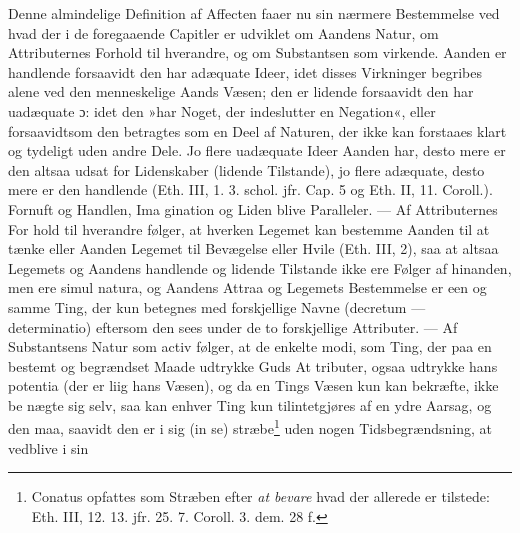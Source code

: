 \documentclass[12pt,a4paper]{book}
\newcommand{\opage}[1]{\marginnote{\footnotesize\textit{[#1]}}}
\begin{document}
Denne almindelige Definition af Affecten faaer nu sin
nærmere Bestemmelse ved hvad der i de foregaaende Capitler
er udviklet om Aandens Natur, om Attributernes Forhold
til hverandre, og om Substantsen som virkende. Aanden
er handlende forsaavidt den har adæquate Ideer, idet
disses Virkninger begribes alene ved den menneskelige
Aands Væsen; den er lidende forsaavidt den har uadæquate
ɔ: idet den »har Noget, der indeslutter en Negation«, eller
forsaavidtsom den betragtes som en Deel af Naturen, der
ikke kan forstaaes klart og tydeligt uden andre Dele. Jo
\opage{112} \setcounter{footnote}{0}%
flere uadæquate Ideer Aanden har, desto mere er den altsaa
udsat for Lidenskaber (lidende Tilstande), jo flere adæquate,
desto mere er den handlende (Eth. III, 1. 3. schol. jfr.
Cap. 5 og Eth. II, 11. Coroll.). Fornuft og Handlen, Ima\-%
gination og Liden blive Paralleler. --- Af Attributernes For\-%
hold til hverandre følger, at hverken Legemet kan bestemme
Aanden til at tænke eller Aanden Legemet til Bevægelse
eller Hvile (Eth. III, 2), saa at altsaa Legemets og Aandens
handlende og lidende Tilstande ikke ere Følger af hinanden,
men ere simul natura, og Aandens Attraa og Legemets
Bestemmelse er een og samme Ting, der kun betegnes med
forskjellige Navne (decretum --- determinatio) eftersom den
sees under de to forskjellige Attributer. --- Af Substantsens
Natur som activ følger, at de enkelte modi, som Ting, der
paa en bestemt og begrændset Maade udtrykke Guds At\-%
tributer, ogsaa udtrykke hans potentia (der er liig hans
Væsen), og da en Tings Væsen kun kan bekræfte, ikke be\-%
nægte sig selv, saa kan enhver Ting kun tilintetgjøres af
en ydre Aarsag, og den maa, saavidt den er i sig (in se)
stræbe\footnote{Conatus opfattes som Stræben efter \emph{at
bevare} hvad der allerede er tilstede: Eth. III, 12. 13. jfr.
25. 7. Coroll. 3. dem. 28 f.} uden nogen Tidsbegrændsning, at
vedblive i sin
\end{document}
